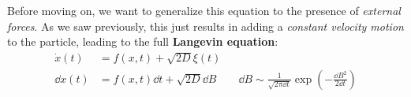 \documentclass[../template.tex]{subfiles}
\begin{document}
\begin{comment}
\begin{align*}
    \xi(t_i) \sim \sqrt{\frac{\Delta t_i}{2 \pi} } \exp\left(-\frac{\Delta t_i \xi_i^2}{2 } \right)
\end{align*}  
and then:
\begin{align*}
    P(\xi \dots ) \propto \exp\left(-\frac{1}{2} \int \xi^2 (\tau) \dd{\tau} \right)
\end{align*}
and $\langle \xi(\tau) \rangle = 0$, $\langle \xi (\tau) \xi (\tau') \rangle = \delta(\tau - \tau')$.
\end{comment}

Before moving on, we want to generalize this equation to the presence of \textit{external forces}. As we saw previously, this just results in adding a \textit{constant velocity motion} to the particle, leading to the full \textbf{Langevin equation}: 
\begin{align*}
    \dot{x}(t) &= f(x,t) + \sqrt{2 D}\xi(t)\\
    \dd{x(t)} &= f(x,t) \dd{t} + \sqrt{2 D} \dd{B} \qquad \dd{B} \sim \frac{1}{\sqrt{2 \pi \dd{t}}} \exp\left(-\frac{\dd{B}^2}{2 \dd{t}} \right) 
\end{align*} 
\end{document}
